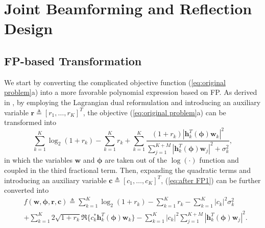 \documentclass[Conference,a4paper]{IEEEtran}
\newcommand{\be}{\begin{equation}}
\newcommand{\ee}{\end{equation}}
\begin{document}
\vspace{-0.1 cm}
\section{Joint Beamforming and Reflection Design}

\subsection{FP-based Transformation}


We start by converting the complicated objective function (\ref{eq:original problem}a) into a more favorable polynomial expression based on FP.
As derived in \cite{Shen-TSP-2018}, by employing the Lagrangian dual reformulation and introducing an auxiliary variable $\mathbf{r}\triangleq[r_1,\ldots,r_K]^T$, the objective (\ref{eq:original problem}a) can be transformed into
\be\label{eq:after FP1}
\sum_{k=1}^K\!\log_2(1+r_k) - \sum_{k=1}^K\!r_k + \sum_{k=1}^K\!\frac{(1+r_k)|\mathbf{h}^T_k(\bm{\phi})\mathbf{w}_k|^2}
{\sum_{j=1}^{K+M}\!|\mathbf{h}^T_k(\bm{\phi})\mathbf{w}_j|^2\!+\!\sigma_k^2},
\ee
in which the variables $\mathbf{w}$ and $\bm{\phi}$ are taken out of the $\log(\cdot)$ function and coupled in the third fractional term.
Then, expanding the quadratic terms and introducing an auxiliary variable $\mathbf{c}\triangleq[c_1,\ldots,c_K]^T$, (\ref{eq:after FP1}) can be further converted into
\be\label{eq:new obj}\begin{aligned}
&f(\mathbf{w},\bm{\phi},\mathbf{r},\mathbf{c}) \triangleq  \sum_{k=1}^K\log_2(1+r_k) - \sum_{k=1}^K r_k -\sum_{k=1}^K|c_k|^2\sigma_k^2 \\
& + \sum_{k=1}^K\!2\sqrt{1\!+\!r_k}\Re\{c_k^*\mathbf{h}^T_k(\bm{\phi})\mathbf{w}_k\} -\!\sum_{k=1}^K\!|c_k|^2\!\!\sum_{j=1}^{K+M}|\mathbf{h}^T_k(\bm{\phi})\mathbf{w}_j|^2.
\end{aligned}\ee
\end{document}
